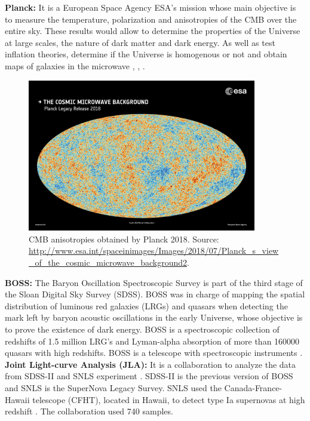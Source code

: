 \documentclass[onecolumn,           %
               showpacs,            %
               preprintnumbers,     %
               aps,                 %
               prl,          	    %
               letterpaper,             %
               superscriptaddress,      %
               nofootinbib,         %
               tightenlines,        %
               floats,floatfix      %
               ,usenatbib,
               ]{revtex4-1}
\begin{document}
\textbf{Planck:} It is a European Space Agency ESA's mission whose main objective is to measure the temperature, polarization and anisotropies of the CMB over the entire sky. These results would allow to determine the properties of the Universe at large scales, the nature of dark matter and dark energy. As well as test inflation theories, determine if the Universe is homogenous or not and obtain maps of galaxies in the microwave \cite{Planck1}, \cite{Planck2}, \cite{Planck3}.\\

\begin{figure}[h]
	\centering
	\includegraphics[width=10cm]{FiguresCosmo/CMB.jpg}	
	\caption{CMB anisotropies obtained by Planck 2018. Source: \url{http://www.esa.int/spaceinimages/Images/2018/07/Planck_s_view_of_the_cosmic_microwave_background2}.}
\end{figure}

\textbf{BOSS:} The Baryon Oscillation Spectroscopic Survey is part of the third stage of the Sloan Digital Sky Survey (SDSS). BOSS was in charge of mapping the spatial distribution of luminous red galaxies (LRGs) and quasars when detecting the mark left by baryon acoustic oscillations in the early Universe, whose objective is to prove the existence of dark energy. BOSS is a spectroscopic collection of redshifts of 1.5 million LRG's and Lyman-alpha absorption of more than 160000 quasars with high redshifts. BOSS is a telescope with spectroscopic instruments \cite{boss}.\\

\textbf{Joint Light-curve Analysis (JLA):} It is a collaboration to analyze the data from SDSS-II and SNLS experiment \cite{jla}. SDSS-II is the previous version of BOSS and SNLS is the SuperNova Legacy Survey. SNLS used the Canada-France-Hawaii telescope (CFHT), located in Hawaii, to detect type Ia supernovas at high redshift \cite{snls}. The collaboration used 740 samples.
\end{document}
